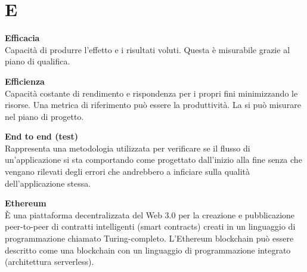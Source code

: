 \section{E}
\textbf{Efficacia}\\
Capacità di produrre l'effetto e i risultati voluti. Questa è misurabile grazie al piano di qualifica.

\textbf{Efficienza}\\
Capacità costante di rendimento e rispondenza per i propri fini minimizzando le risorse. Una metrica di riferimento può essere la  produttività. La si può misurare nel piano di progetto.

\textbf{End to end (test)}\\
Rappresenta una metodologia utilizzata per verificare se il flusso di un'applicazione si sta comportando come progettato dall'inizio alla fine senza che vengano rilevati degli errori che andrebbero a inficiare sulla qualità dell’applicazione stessa.

\textbf{Ethereum}\\
È una piattaforma decentralizzata del Web 3.0 per la creazione e pubblicazione peer-to-peer di contratti intelligenti (smart contracts) creati in un linguaggio di programmazione chiamato Turing-completo. L'Ethereum blockchain può essere descritto come una blockchain con un linguaggio di programmazione integrato (architettura serverless).

\clearpage